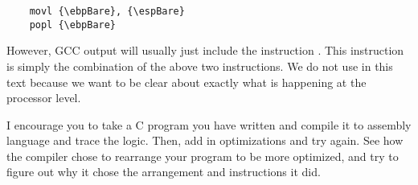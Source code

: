 \begin{simpletyping}
\begin{lstlisting}
	movl {\ebpBare}, {\espBare}
	popl {\ebpBare}
\end{lstlisting}
\end{simpletyping}

However, GCC output will usually just include the instruction 
.  This instruction is simply the combination
of the above two instructions.  We do not use 
in this text because we want to be clear about exactly what is happening
at the processor level.

I encourage you to take a C program you have written and compile it
to assembly language and trace the logic.  Then, add in optimizations
and try again.  See how the compiler chose to rearrange your program
to be more optimized, and try to figure out why it chose the arrangement
and instructions it did.

